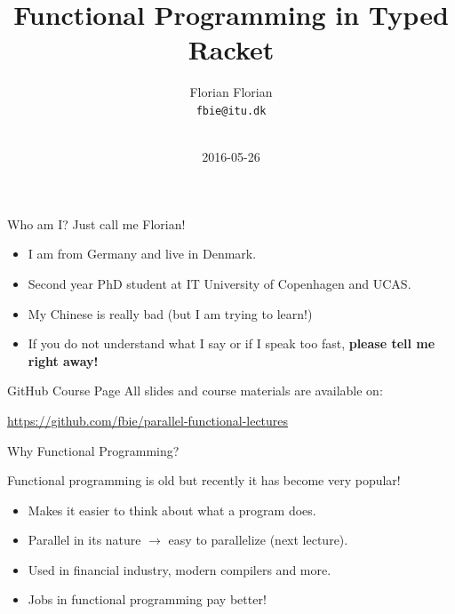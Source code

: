 \documentclass{beamer}
\title{Functional Programming in Typed Racket}
\author{Florian Florian \\\small{\texttt{fbie@itu.dk}} \\~}
\institute{IT University of Copenhagen \& UCAS}
\date{2016-05-26}
\begin{document}
\begin{frame}
  \titlepage{}
\end{frame}

\begin{frame}{Who am I?}
  Just call me Florian!

  \begin{itemize}
  \pause{} \item I am from Germany and live in Denmark.
  \pause{} \item Second year PhD student at IT University of Copenhagen and UCAS.
  \pause{} \item My Chinese is really bad (but I am trying to learn!)
  \pause{} \item If you do not understand what I say or if I speak too fast, \textbf{please tell me right away!}
  \end{itemize}
\end{frame}

\begin{frame}{GitHub Course Page}
  All slides and course materials are available on:

  \begin{center}
    \url{https://github.com/fbie/parallel-functional-lectures}
  \end{center}
\end{frame}

\begin{frame}{Why Functional Programming?}

  Functional programming is old but recently it has become very popular!

  \begin{itemize}
  \pause{} \item Makes it easier to think about what a program does.
  \pause{} \item Parallel in its nature $\rightarrow$ easy to parallelize (next lecture).
  \pause{} \item Used in financial industry, modern compilers and more.
  \pause{} \item Jobs in functional programming pay better!
  \end{itemize}

\end{frame}
\end{document}
